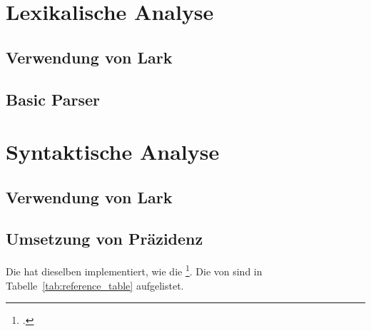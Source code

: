\section{Lexikalische Analyse}
\subsection{Verwendung von Lark}
\subsection{Basic Parser}
\section{Syntaktische Analyse}
\subsection{Verwendung von Lark}
\subsection{Umsetzung von Präzidenz}
Die  hat dieselben  implementiert, wie die  \footcite{noauthor_c_nodate}. Die  von  sind in Tabelle~\ref{tab:reference_table} aufgelistet.

